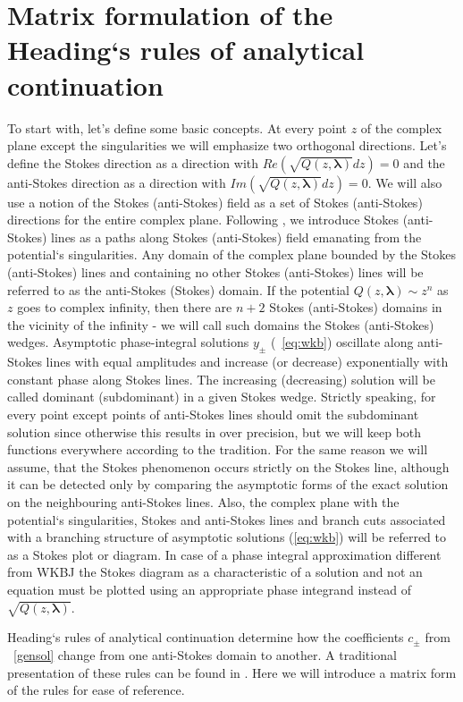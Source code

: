\documentclass[12pt]{iopart}
\def\lmbd{\bm{\lambda}}
\begin{document}
\section{Matrix formulation of the Heading`s rules of analytical continuation \label{sec:mtrxfrm}}
To start with, let's define some basic concepts. At every point $z$ of the complex plane except the singularities we will emphasize two orthogonal directions. Let's define the Stokes direction 
as a direction with $Re \left( \sqrt{Q(z,\lmbd)}dz \right)=0$ and the anti-Stokes direction 
as a direction with $Im \left( \sqrt{Q(z,\lmbd)}dz \right)=0$. We will also use a notion of the Stokes (anti-Stokes) field as a set of Stokes (anti-Stokes) directions for the entire complex plane. Following \cite{heading, white}, we introduce Stokes (anti-Stokes) lines as a paths along Stokes (anti-Stokes) field emanating from the potential`s singularities. Any domain of the complex plane bounded by the Stokes (anti-Stokes) lines and containing no other Stokes (anti-Stokes) lines will be referred to as the anti-Stokes (Stokes) domain. If the potential $Q(z,\lmbd) \sim z^n$ as $z$ goes to complex infinity, then there are $n+2$ Stokes (anti-Stokes) domains in the vicinity of the infinity - we will call such domains the Stokes (anti-Stokes) wedges. Asymptotic phase-integral solutions $y_\pm$ (~\ref{eq:wkb}) oscillate along anti-Stokes lines with equal amplitudes and increase (or decrease) exponentially with constant phase along Stokes lines. The increasing (decreasing) solution will be called dominant (subdominant) in a given Stokes wedge. Strictly speaking, for every point except points of anti-Stokes lines should omit the subdominant solution since otherwise this results in over precision, but we will keep both functions everywhere according to the tradition. For the same reason we will assume, that the Stokes phenomenon occurs strictly on the Stokes line, although it can be detected only by comparing the asymptotic forms of the exact solution on the neighbouring anti-Stokes lines. Also, the complex plane with the potential`s singularities, Stokes and anti-Stokes lines and branch cuts associated with a branching structure of asymptotic solutions (\ref{eq:wkb}) will be referred to as a Stokes plot or diagram. In case of a phase integral approximation different from WKBJ the Stokes diagram as a characteristic of a solution and not an equation must be plotted using an appropriate phase integrand instead of $\sqrt{Q(z,\lmbd)}$.

Heading`s rules of analytical continuation determine how the coefficients $c_\pm$ from ~\ref{gensol} change from one anti-Stokes domain to another. A traditional presentation of these rules can be found in \cite{heading, white}. Here we will introduce a matrix form of the rules for ease of reference.
\end{document}
